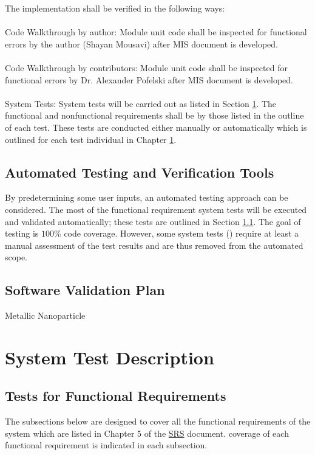 \documentclass[12pt, titlepage]{article}
\begin{document}
The implementation shall be verified in the following ways:\\
\\
Code Walkthrough by author:  Module unit code shall be inspected for functional errors by the author (Shayan Mousavi) after MIS document is developed.\\  
\\
Code Walkthrough by contributors: Module unit code shall be inspected for functional errors by Dr. Alexander Pofelski after MIS document is developed.\\
\\
System Tests:  System tests will be carried out as listed in Section \ref{systest}. The functional and nonfunctional requirements shall be by those listed in the outline of each test. These tests are conducted either manually or automatically which is outlined for each test individual in Chapter \ref{systest}. 

\subsection{Automated Testing and Verification Tools}

By predetermining some user inputs, an automated testing approach can be
considered. The most of the functional requirement system tests will be executed and
validated automatically; these tests are outlined in Section \ref{func}. The goal of testing is $100\%$ code coverage. However, some system tests () require at least a manual assessment of the test results and
are thus removed from the automated scope.
\subsection{Software Validation Plan}

Metallic Nanoparticle 

\section{System Test Description}
\label{systest}

\subsection{Tests for Functional Requirements}
\label{func}
The subsections below are designed to cover all the functional requirements of the system which are listed in Chapter 5 of the \href{https://github.com/shmouses/SPDFM/tree/master/docs/SRS}{SRS} document. coverage of each functional requirement is indicated in each subsection.
\end{document}
